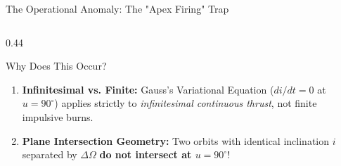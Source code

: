 \documentclass[aspectratio=169,10pt]{beamer}
\begin{document}
\begin{frame}{The Operational Anomaly: The "Apex Firing" Trap}
\begin{columns}[t]
        \begin{column}{0.44\textwidth}
            \begin{block}{Why Does This Occur?}
                \footnotesize
                \begin{enumerate}\setlength{\itemsep}{4pt}
                    \item \textbf{Infinitesimal vs. Finite:} Gauss's Variational Equation ($di/dt = 0$ at $u = 90^\circ$) applies strictly to \textit{infinitesimal continuous thrust}, not finite impulsive burns.
                    \item \textbf{Plane Intersection Geometry:} Two orbits with identical inclination $i$ separated by $\Delta\Omega$ \textbf{do not intersect at $u = 90^\circ$}!
                \end{enumerate}
            \end{block}
        \end{column}
    \end{columns}
\end{frame}
\end{document}
